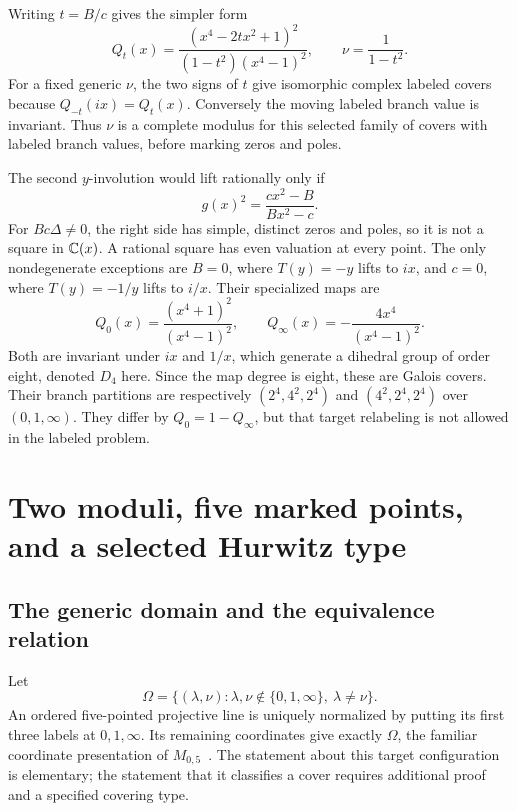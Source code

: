 Writing \(t=B/c\) gives the simpler form
\begin{equation}\label{eq:Qt}
Q_t(x)=\frac{(x^4-2tx^2+1)^2}{(1-t^2)(x^4-1)^2},\qquad
\nu=\frac1{1-t^2}.
\end{equation}
For a fixed generic \(\nu\), the two signs of \(t\) give isomorphic complex labeled covers because \(Q_{-t}(ix)=Q_t(x)\). Conversely the moving labeled branch value is invariant. Thus \(\nu\) is a complete modulus for this selected family of covers with labeled branch values, before marking zeros and poles.

The second \(y\)-involution would lift rationally only if
\[
g(x)^2=\frac{cx^2-B}{Bx^2-c}.
\]
For \(Bc\Delta\ne0\), the right side has simple, distinct zeros and poles, so it is not a square in \(\mathbb C(x)\). A rational square has even valuation at every point. The only nondegenerate exceptions are \(B=0\), where \(T(y)=-y\) lifts to \(ix\), and \(c=0\), where \(T(y)=-1/y\) lifts to \(i/x\). Their specialized maps are
\begin{equation}\label{eq:D4special}
Q_0(x)=\frac{(x^4+1)^2}{(x^4-1)^2},\qquad
Q_\infty(x)=-\frac{4x^4}{(x^4-1)^2}.
\end{equation}
Both are invariant under \(ix\) and \(1/x\), which generate a dihedral group of order eight, denoted \(D_4\) here. Since the map degree is eight, these are Galois covers. Their branch partitions are respectively \((2^4,4^2,2^4)\) and \((4^2,2^4,2^4)\) over \((0,1,\infty)\). They differ by \(Q_0=1-Q_\infty\), but that target relabeling is not allowed in the labeled problem.

\section{Two moduli, five marked points, and a selected Hurwitz type}\label{sec:moduli}

\subsection{The generic domain and the equivalence relation}
Let
\begin{equation}\label{eq:Omega}
\Omega=\{(\lambda,\nu):\lambda,\nu\notin\{0,1,\infty\},\ \lambda\ne\nu\}.
\end{equation}
An ordered five-pointed projective line is uniquely normalized by putting its first three labels at \(0,1,\infty\). Its remaining coordinates give exactly \(\Omega\), the familiar coordinate presentation of \(M_{0,5}\)~\cite[Eq.~(210)]{Mnev}. The statement about this target configuration is elementary; the statement that it classifies a cover requires additional proof and a specified covering type.

